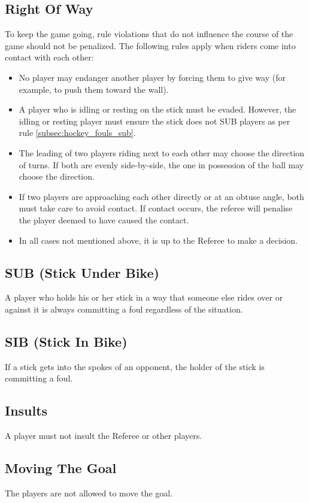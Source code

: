 \subsection{Right Of Way}
To keep the game going, rule violations that do not influence the course of the game should not be penalized.
The following rules apply when riders come into contact with each other:
\begin{itemize}
\item No player may endanger another player by forcing them to give way (for example, to push them toward the wall).
\item A player who is idling or resting on the stick must be evaded.
  However, the idling or resting player must ensure the stick does not SUB players as per rule \ref{subsec:hockey_fouls_sub}.
\item The leading of two players riding next to each other may choose the direction of turns.
If both are evenly side-by-side, the one in possession of the ball may choose the direction.
\item If two players are approaching each other directly or at an obtuse angle, both must take care to avoid contact.
  If contact occurs, the referee will penalise the player deemed to have caused the contact.
\item In all cases not mentioned above, it is up to the Referee to make a decision.
\end{itemize}

\subsection{SUB (Stick Under Bike) \label{subsec:hockey_fouls_sub}}
A player who holds his or her stick in a way that someone else rides over or against it is always committing a foul regardless of the situation.

\subsection{SIB (Stick In Bike)}
If a stick gets into the spokes of an opponent, the holder of the stick is committing a foul.

\subsection{Insults}
A player must not insult the Referee or other players.

\subsection{Moving The Goal}
The players are not allowed to move the goal.

